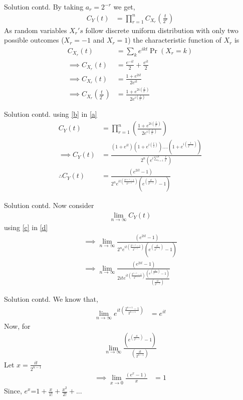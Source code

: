 \documentclass{beamer}
\providecommand{\pr}[1]{\ensuremath{\Pr\left(#1\right)}}
\providecommand{\brak}[1]{\ensuremath{\left(#1\right)}}
\begin{document}
\begin{frame}{Solution contd.}
By taking $a_r=2^{-r}$ we get,
\begin{align}
    C_{Y}\brak{t}&=\prod_{r=1}^{n}C_{X_r}\brak{\frac{t}{2^r}}
    \label{a}
\end{align}
As random variables $X_r's$ follow discrete uniform distribution with only two possible outcomes ($X_r=-1$ and $X_r=1$) the characteristic function of $X_r$ is
\begin{align}
    C_{X_r}\brak{t}&=\sum_{k}e^{ikt}\pr{X_r=k}\\
    \implies C_{X_r}\brak{t}&=\frac{e^{-it}}{2}+\frac{e^{it}}{2}\\
    \implies C_{X_r}\brak{t}&=\frac{1+e^{2it}}{2e^{it}}\\
    \implies C_{X_r}\brak{\frac{t}{2^r}}&=\frac{1+e^{2i\brak{\frac{t}{2^r}}}}{2e^{i\brak{\frac{t}{2^r}}}}
        \label{b}
\end{align}
\end{frame}
\begin{frame}{Solution contd.}
 using \eqref{b} in \eqref{a}
\begin{align}
    C_{Y}\brak{t}&=\prod_{r=1}^{n}\brak{\frac{1+e^{2i\brak{\frac{t}{2^r}}}}{2e^{i\brak{\frac{t}{2^r}}}}}\\
    \implies C_{Y}\brak{t}&=\frac{\brak{1+e^{it}}\brak{1+e^{i\brak{\frac{t}{2}}}}....\brak{1+e^{i\brak{\frac{t}{2^{n-1}}}}}}{2^n\brak{e^{i\sum_{r=1}^n\frac{t}{2^r}}}}\\
     \therefore C_{Y}\brak{t}&=\frac{\brak{e^{2it}-1}}{2^ne^{it\brak{\frac{2^{n+1}-1}{2^{n+1}}}}\brak{e^{\brak{\frac{it}{2^{n-1}}}}-1}}
     \label{c}
\end{align}   
\end{frame}
\begin{frame}{Solution contd.}
    Now consider
\begin{align}
     \lim_{n\to\infty} C_{Y}\brak{t}
     \label{d}
\end{align}
using \eqref{c} in \eqref{d}
\begin{align}
    \implies \lim_{n\to\infty}\frac{\brak{e^{2it}-1}}{2^ne^{it\brak{\frac{2^{n+1}-1}{2^{n+1}}}}\brak{e^{\brak{\frac{it}{2^{n-1}}}}-1}}
    \label{e}\\
    \implies \lim_{n\to\infty}\frac{\brak{e^{2it}-1}}{2ite^{it\brak{\frac{2^{n+1}-1}{2^{n+1}}}}\frac{\brak{e^{\brak{\frac{it}{2^{n-1}}}}-1}}{\brak{\frac{it}{2^{n-1}}}}}
    \label{e}
\end{align}
\end{frame}
\begin{frame}{Solution contd.}
    We know that,
\begin{align}
    \lim_{n\to\infty}e^{it\brak{\frac{2^{n+1}-1}{2^{n+1}}}}&=e^{it}
    \label{g}
\end{align}
Now, for
\begin{align}
     \lim_{n\to\infty}\frac{\brak{e^{\brak{\frac{it}{2^{n-1}}}}-1}}{\brak{\frac{it}{2^{n-1}}}}
\end{align}
Let $x=\frac{it}{2^{n-1}}$
\begin{align}
    \implies \lim_{x\to0}\frac{\brak{e^x-1}}{x} &=1
\end{align}
Since, $e^x$=$1+\frac{x}{1!}+\frac{x^2}{2!}+...$
\end{frame}
\end{document}
